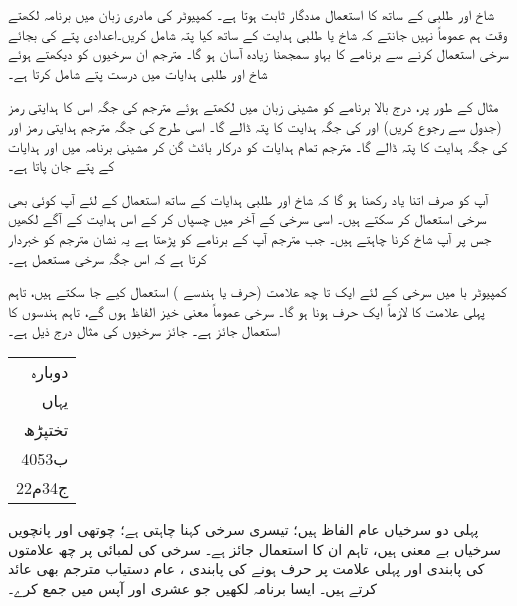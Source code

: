 شاخ اور طلبی  کے ساتھ کا استعمال مددگار ثابت ہوتا ہے۔ کمپیوٹر کی مادری زبان میں برنامہ لکھتے وقت  ہم عموماً نہیں جانتے کہ شاخ یا طلبی ہدایت کے ساتھ کیا پتہ شامل کریں۔اعدادی پتے کی بجائے سرخی استعمال کرنے سے  برنامے کا بہاو  سمجھنا  زیادہ  آسان ہو گا۔ مترجم ان سرخیوں کو دیکھتے ہوئے شاخ اور طلبی  ہدایات میں  درست پتے شامل کرتا ہے۔

مثال کے طور پر، درج بالا برنامے کو مشینی زبان میں  لکھتے ہوئے مترجم  \sJZ کی جگہ اس کا ہدایتی رمز   (جدول  سے رجوع کریں)  اور    کی جگہ \sHLT ہدایت کا پتہ ڈالے گا۔ اسی طرح \sJMP کی جگہ مترجم  ہدایتی رمز    اور    کی جگہ   ہدایت \DCR{\regC} کا پتہ ڈالے گا۔ مترجم تمام ہدایات کو درکار بائٹ گن کر    مشینی برنامہ میں   \sHLT اور \sJMP ہدایات کے پتے جان پاتا ہے۔

آپ کو صرف اتنا یاد رکھنا ہو گا کہ شاخ اور طلبی ہدایات کے ساتھ استعمال کے لئے  آپ کوئی بھی  سرخی  استعمال کر سکتے ہیں۔ اسی  سرخی کے آخر میں   چسپاں کر کے  اس ہدایت کے آگے لکھیں جس پر آپ شاخ کرنا  چاہتے ہیں۔ جب مترجم آپ کے برنامے کو پڑھتا ہے یہ نشان  مترجم کو خبردار کرتا ہے کہ اس جگہ سرخی مستعمل ہے۔

کمپیوٹر با میں  سرخی کے لئے ایک  تا  چھ    علامت (حرف یا ہندسے ) استعمال کیے جا سکتے ہیں، تاہم پہلی علامت کا  لازماً ایک  حرف  ہونا ہو گا۔ سرخی عموماً معنی خیز الفاظ ہوں گے،  تاہم ہندسوں کا استعمال جائز ہے۔ جائز سرخیوں کی مثال درج ذیل ہے۔
 \begin{center}
\begin{tabular}{r}
دوبارہ\\ 
یہاں\\
تختپڑھ\\
ب4053\\
ج34م22
\end{tabular}
\end{center}
پہلی دو سرخیاں  عام الفاظ ہیں؛ تیسری سرخی     کہنا چاہتی ہے؛ چوتھی اور پانچویں  سرخیاں بے معنی   ہیں، تاہم ان کا استعمال جائز ہے۔ سرخی کی لمبائی پر چھ علامتوں کی  پابندی اور پہلی علامت    پر  حرف ہونے کی   پابندی  ، عام  دستیاب مترجم    بھی عائد کرتے ہیں۔
ایسا برنامہ لکھیں جو عشری  اور  آپس میں جمع کرے۔

